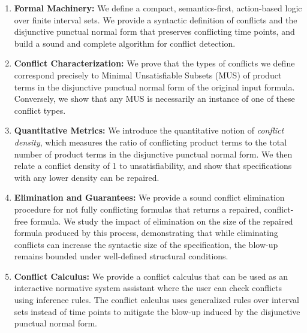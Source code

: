 \begin{enumerate}[Con1]

    \item \textbf{Formal Machinery:} We define a compact, semantics-first, action-based logic over finite interval sets. We provide a syntactic definition of conflicts and the disjunctive punctual normal form that preserves conflicting time points, and build a sound and complete algorithm for conflict detection.

    

    \item \textbf{Conflict Characterization:} We prove that the types of conflicts we define correspond precisely to Minimal Unsatisfiable Subsets (MUS) of product terms in the disjunctive punctual normal form of the original input formula. Conversely, we show that any MUS is necessarily an instance of one of these conflict types.

    

    \item \textbf{Quantitative Metrics:} We introduce the quantitative notion of \emph{conflict density}, which measures the ratio of conflicting product terms to the total number of product terms in the disjunctive punctual normal form. We then relate a conflict density of 1 to unsatisfiability, and show that specifications with any lower density can be repaired.

   

    \item \textbf{Elimination and Guarantees:} We provide a sound conflict elimination procedure for not fully conflicting formulas that returns a repaired, conflict-free formula. We study the impact of elimination on the size of the repaired formula produced by this process, demonstrating that while eliminating conflicts can increase the syntactic size of the specification, the blow-up remains bounded under well-defined structural conditions.



    \item \textbf{Conflict Calculus:} We provide a conflict calculus that can be used as an interactive normative system assistant where the user can check conflicts using inference rules. The conflict calculus uses generalized rules over interval sets instead of time points to mitigate the blow-up induced by the disjunctive punctual normal form.

\end{enumerate}



